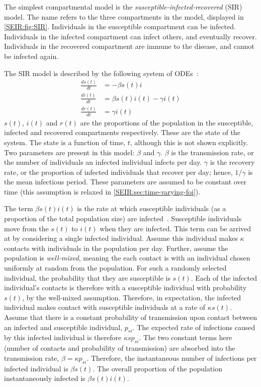 \documentclass[thesis.tex]{subfiles}
\begin{document}
The simplest compartmental model is the \emph{susceptible-infected-recovered} (SIR) model.
The name refers to the three compartments in the model, displayed in \cref{SEIR:fig:SIR}.
Individuals in the susceptible compartment can be infected.
Individuals in the infected compartment can infect others, and eventually recover.
Individuals in the recovered compartment are immune to the disease, and cannot be infected again.

The SIR model is described by the following system of ODEs~\autocite[19]{keelingModeling}:
\begin{align}
\frac{ds(t)}{dt} &= -\beta s(t)i \\
\frac{di(t)}{dt} &= \beta s(t)i(t) - \gamma i(t) \\
\frac{dr(t)}{dt} &= \gamma i(t)
\end{align}
$s(t)$, $i(t)$ and $r(t)$ are the proportions of the population in the susceptible, infected and recovered compartments respectively.
These are the state of the system.
The state is a function of time, $t$, although this is not shown explicitly.
Two parameters are present in this model: $\beta$ and $\gamma$.
$\beta$ is the transmission rate, or the number of individuals an infected individual infects per day.
$\gamma$ is the recovery rate, or the proportion of infected individuals that recover per day; hence, $1/\gamma$ is the mean infectious period.
These parameters are assumed to be constant over time (this assumption is relaxed in \cref{SEIR:sec:time-varying-foi}).

The term $\beta s(t)i(t)$ is the rate at which susceptible individuals (as a proportion of the total population size) are infected~\autocite[18]{keelingModeling}.
Susceptible individuals move from the $s(t)$ to $i(t)$ when they are infected.
This term can be arrived at by considering a single infected individual.
Assume this individual makes $\kappa$ contacts with individuals in the population per day.
Further, assume the population is \emph{well-mixed}, meaning the each contact is with an individual chosen uniformly at random from the population.
For such a randomly selected individual, the probability that they are susceptible is $s(t)$.
Each of the infected individual's contacts is therefore with a susceptible individual with probability $s(t)$, by the well-mixed assumption.
Therefore, in expectation, the infected individual makes contact with susceptible individuals at a rate of $\kappa s(t)$.
Assume that there is a constant probability of transmission upon contact between an infected and susceptible individual, $p_{si}$.
The expected rate of infections caused by this infected individual is therefore $\kappa s p_{si}$.
The two constant terms here (number of contacts and probability of transmission) are absorbed into the transmission rate, $\beta = \kappa p_{si}$.
Therefore, the instantaneous number of infections per infected individual is $\beta s(t)$.
The overall proportion of the population instantaneously infected is $\beta s(t)i(t)$.
\end{document}
